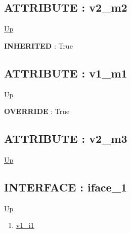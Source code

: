 \subsection*{ATTRIBUTE : v2\_m2}
\hypertarget{ecldoc:intest.example_2.mod_2.v2_m2}{}
\par
\begin{minipage}[t]{\textwidth}
\begin{flushleft}
  
\end{flushleft}
\end{minipage}
\hyperlink{ecldoc:intest.example_2.mod_3}{Up} \\
\par
\par
\textbf{INHERITED} : True \\
\subsection*{ATTRIBUTE : v1\_m1}
\hypertarget{ecldoc:intest.example_2.mod_3.v1_m1}{}
\par
\begin{minipage}[t]{\textwidth}
\begin{flushleft}
  
\end{flushleft}
\end{minipage}
\hyperlink{ecldoc:intest.example_2.mod_3}{Up} \\
\par
\par
\textbf{OVERRIDE} : True \\
\subsection*{ATTRIBUTE : v2\_m3}
\hypertarget{ecldoc:intest.example_2.mod_3.v2_m3}{}
\par
\begin{minipage}[t]{\textwidth}
\begin{flushleft}
  
\end{flushleft}
\end{minipage}
\hyperlink{ecldoc:intest.example_2.mod_3}{Up} \\
\par
\par

\subsection*{INTERFACE : iface\_1}
\hypertarget{ecldoc:intest.example_2.iface_1}{}
\par
\begin{minipage}[t]{\textwidth}
\begin{flushleft}
  
\end{flushleft}
\end{minipage}
\hyperlink{ecldoc:intest.example_2}{Up} \\
\par
\par
\begin{enumerate}
\item \hyperlink{ecldoc:intest.example_2.iface_1.v1_i1}{v1\_i1}
\end{enumerate}
